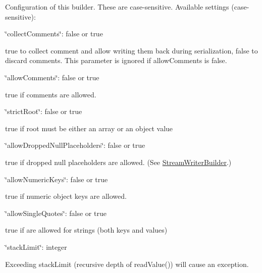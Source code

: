 Configuration of this builder. These are case-\/sensitive. Available settings (case-\/sensitive)\+:
\begin{DoxyItemize}
\item {\ttfamily \char`\"{}collect\+Comments\char`\"{}\+: false or true}
\begin{DoxyItemize}
\item true to collect comment and allow writing them back during serialization, false to discard comments. This parameter is ignored if allow\+Comments is false.
\end{DoxyItemize}
\item {\ttfamily \char`\"{}allow\+Comments\char`\"{}\+: false or true}
\begin{DoxyItemize}
\item true if comments are allowed.
\end{DoxyItemize}
\item {\ttfamily \char`\"{}strict\+Root\char`\"{}\+: false or true}
\begin{DoxyItemize}
\item true if root must be either an array or an object value
\end{DoxyItemize}
\item {\ttfamily \char`\"{}allow\+Dropped\+Null\+Placeholders\char`\"{}\+: false or true}
\begin{DoxyItemize}
\item true if dropped null placeholders are allowed. (See \hyperlink{classJson_1_1StreamWriterBuilder}{Stream\+Writer\+Builder}.)
\end{DoxyItemize}
\item {\ttfamily \char`\"{}allow\+Numeric\+Keys\char`\"{}\+: false or true}
\begin{DoxyItemize}
\item true if numeric object keys are allowed.
\end{DoxyItemize}
\item {\ttfamily \char`\"{}allow\+Single\+Quotes\char`\"{}\+: false or true}
\begin{DoxyItemize}
\item true if \textquotesingle{}\textquotesingle{} are allowed for strings (both keys and values)
\end{DoxyItemize}
\item {\ttfamily \char`\"{}stack\+Limit\char`\"{}\+: integer}
\begin{DoxyItemize}
\item Exceeding stack\+Limit (recursive depth of {\ttfamily read\+Value()}) will cause an exception.

\end{DoxyItemize}
\end{DoxyItemize}
